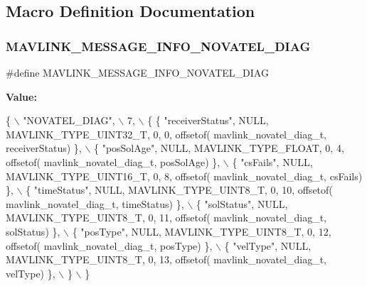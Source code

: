 \subsection{Macro Definition Documentation}
\mbox{\label{mavlink__msg__novatel__diag_8h_aec546d00d5b97ffe74ad410c78f93724}} 
\subsubsection{M\+A\+V\+L\+I\+N\+K\+\_\+\+M\+E\+S\+S\+A\+G\+E\+\_\+\+I\+N\+F\+O\+\_\+\+N\+O\+V\+A\+T\+E\+L\+\_\+\+D\+I\+AG}
{\footnotesize\ttfamily \#define M\+A\+V\+L\+I\+N\+K\+\_\+\+M\+E\+S\+S\+A\+G\+E\+\_\+\+I\+N\+F\+O\+\_\+\+N\+O\+V\+A\+T\+E\+L\+\_\+\+D\+I\+AG}

{\bfseries Value\+:}
\begin{DoxyCode}
\{ \(\backslash\)
    \textcolor{stringliteral}{"NOVATEL\_DIAG"}, \(\backslash\)
    7, \(\backslash\)
    \{  \{ \textcolor{stringliteral}{"receiverStatus"}, NULL, MAVLINK_TYPE_UINT32_T, 0, 0, offsetof(
      mavlink_novatel_diag_t, receiverStatus) \}, \(\backslash\)
         \{ \textcolor{stringliteral}{"posSolAge"}, NULL, MAVLINK_TYPE_FLOAT, 0, 4, offsetof(
      mavlink_novatel_diag_t, posSolAge) \}, \(\backslash\)
         \{ \textcolor{stringliteral}{"csFails"}, NULL, MAVLINK_TYPE_UINT16_T, 0, 8, offsetof(
      mavlink_novatel_diag_t, csFails) \}, \(\backslash\)
         \{ \textcolor{stringliteral}{"timeStatus"}, NULL, MAVLINK_TYPE_UINT8_T, 0, 10, offsetof(
      mavlink_novatel_diag_t, timeStatus) \}, \(\backslash\)
         \{ \textcolor{stringliteral}{"solStatus"}, NULL, MAVLINK_TYPE_UINT8_T, 0, 11, offsetof(
      mavlink_novatel_diag_t, solStatus) \}, \(\backslash\)
         \{ \textcolor{stringliteral}{"posType"}, NULL, MAVLINK_TYPE_UINT8_T, 0, 12, offsetof(
      mavlink_novatel_diag_t, posType) \}, \(\backslash\)
         \{ \textcolor{stringliteral}{"velType"}, NULL, MAVLINK_TYPE_UINT8_T, 0, 13, offsetof(
      mavlink_novatel_diag_t, velType) \}, \(\backslash\)
         \} \(\backslash\)
\}
\end{DoxyCode}
\mbox{\label{mavlink__msg__novatel__diag_8h_adc653a7640d51508bbc3210feca040be}} 
